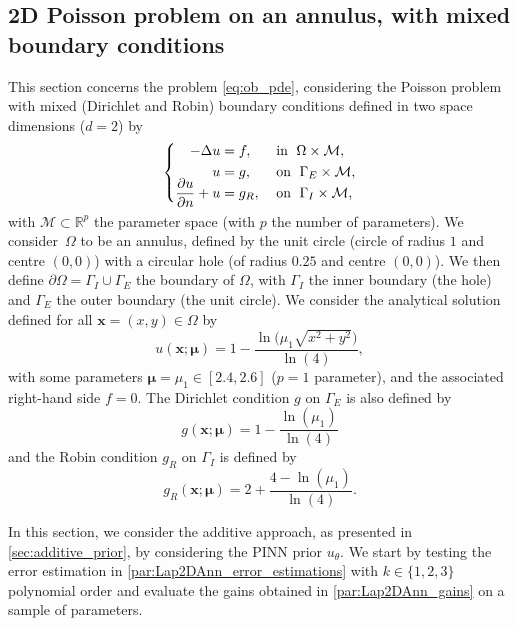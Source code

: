 \subsection{2D Poisson problem on an annulus, with mixed boundary conditions} \label{sec:Lap2DMixRing}

This section concerns the problem \eqref{eq:ob_pde}, considering the Poisson problem with mixed (Dirichlet and Robin) boundary conditions defined in two space dimensions ($d=2$) by
\begin{equation*}
	\left\{
	\begin{aligned}
		-\Delta u & = f, \; &  & \text{in } \; \Omega \times \mathcal{M}, \\
		u         & = g, \;  &  & \text{on } \; \Gamma_E \times \mathcal{M}, \\
        \smash{\frac{\partial u}{\partial n}}+u  & = g_R, \;  &  & \text{on } \; \Gamma_I \times \mathcal{M},
	\end{aligned}
	\right.
	\label{eq:Lap2DMixed}
\end{equation*}
with $\mathcal{M} \subset \mathbb{R}^p$ the parameter space (with $p$ the number of parameters). We consider~$\Omega$ to be an annulus, defined by the unit circle (circle of radius $1$ and centre $(0,0)$) with a circular hole (of radius $0.25$ and centre $(0,0)$). We then define $\partial\Omega=\Gamma_I\cup\Gamma_E$ the boundary of $\Omega$, with $\Gamma_I$ the inner boundary (the hole) and $\Gamma_E$ the outer boundary (the unit circle). We consider the analytical solution defined for all $\bm{x}=(x,y)\in\Omega$ by
\begin{equation*}
	u(\bm{x};\bm{\mu})= 1 - \frac{\ln\big(\mu_1\sqrt{x^2+y^2}\big)}{\ln(4)},
\end{equation*}
with some parameters $\bm{\mu}=\mu_1\in[2.4, 2.6]$ ($p=1$ parameter), and the associated right-hand side $f=0$. The Dirichlet condition $g$ on $\Gamma_E$ is also defined by
\begin{equation*}
	g(\bm{x};\bm{\mu})=1 - \frac{\ln(\mu_1)}{\ln(4)}
\end{equation*}
and the Robin condition $g_R$ on $\Gamma_I$ is defined by
\begin{equation*}
    g_R(\bm{x};\bm{\mu})=2 + \frac{4-\ln(\mu_1)}{\ln(4)}.
\end{equation*}

In this section, we consider the additive approach, as presented in \cref{sec:additive_prior}, by considering the PINN prior $u_\theta$. We start by testing the error estimation in \cref{par:Lap2DAnn_error_estimations} with $k\in\{1,2,3\}$ polynomial order and evaluate the gains obtained in \cref{par:Lap2DAnn_gains} on a sample of parameters.

